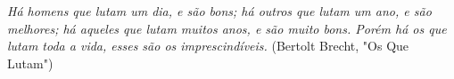 \vspace{14cm}
{\it Há homens que lutam um dia, e são bons; há outros que lutam um ano, e são melhores; há aqueles que lutam muitos anos, e são muito bons.
Porém há os que lutam toda a vida, esses são os imprescindíveis.} (Bertolt Brecht, "Os Que Lutam")
